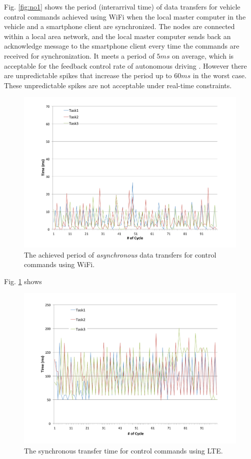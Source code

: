 Fig. \ref{fig:no1} shows the period (interarrival time) of data
transfers for vehicle control commands achieved using WiFi when the
local master computer in the vehicle and a smartphone client are
synchronized.
The nodes are connected within a local area network, and the local
master computer sends back an acknowledge message to the smartphone
client every time the commands are received for synchronization.
It meets a period of $5ms$ on average, which is acceptable for the
feedback control rate of autonomous driving \cite{Kagami13}.
However there are unpredictable spikes that increase the period up to
$60ms$ in the worst case.
These unpredictable spikes are not acceptable under real-time
constraints.

\begin{figure}[!t]
 \centering
 \includegraphics[width=0.8\hsize]{fig/No4_Andrive_serv_cycle_WiFi_only_send.pdf}
 \caption{The achieved period of \textit{asynchronous} data transfers
 for control commands using WiFi.}
 \label{fig:no4}
\end{figure}

Fig. \ref{fig:no4} shows 

\begin{figure}[!t]
 \centering
 \includegraphics[width=0.8\hsize]{fig/No2_Andrive_serv_cycle_LTE.pdf}
 \caption{The synchronous transfer time for control commands using LTE.}
 \label{fig:no2}
\end{figure}

